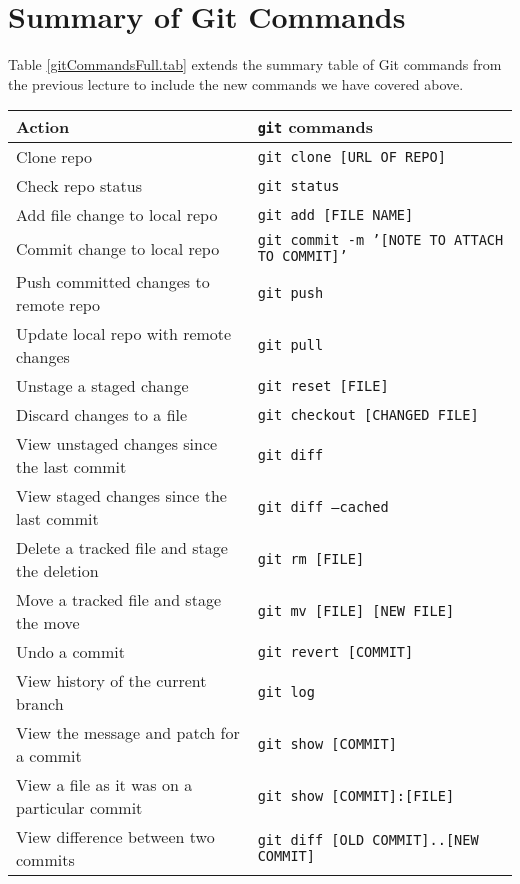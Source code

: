 \newpage
\section{Summary of Git Commands}

Table \ref{gitCommandsFull.tab} extends the summary table of Git commands from
the previous lecture to include the new commands we have covered above.

\begin{table}[htbp!]
    \centering
    \begin{tabular}{l|l} \hline
      Action & \verb|git| commands \\ \hline
         Clone repo &  \texttt{git clone [URL OF REPO]}\\ \hline
         Check repo status & \texttt{git status} \\
         Add file change to local repo & \texttt{git add [FILE NAME]} \\
         Commit change to local repo & \texttt{git commit -m '[NOTE TO ATTACH TO COMMIT]'} \\
         Push committed changes to remote repo & \texttt{git push} \\
         Update local repo with remote changes & \texttt{git pull} \\ \hline
         Unstage a staged change & \texttt{git reset [FILE]} \\
         Discard changes to a file & \texttt{git checkout [CHANGED FILE]} \\
         View unstaged changes since the last commit & \texttt{git diff} \\
         View staged changes since the last commit & \texttt{git diff --cached} \\
         Delete a tracked file and stage the deletion & \texttt{git rm [FILE]} \\
         Move a tracked file and stage the move & \texttt{git mv [FILE] [NEW FILE]} \\
         Undo a commit & \texttt{git revert [COMMIT]} \\ \hline
         View history of the current branch & \texttt{git log} \\
         View the message and patch for a commit & \texttt{git show [COMMIT]} \\
         View a file as it was on a particular commit & \texttt{git show [COMMIT]:[FILE]} \\
         View difference between two commits & \texttt{git diff [OLD COMMIT]..[NEW COMMIT]} \\

\end{tabular}
\end{table}

